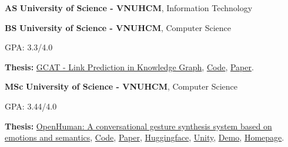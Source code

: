 

\begin{threecolentry}{\textbf{AS}}{
	}
	\textbf{University of Science - VNUHCM}, Information Technology
\end{threecolentry}

\begin{threecolentry}{\textbf{BS}}{
	}
	\textbf{University of Science - VNUHCM}, Computer Science
	\begin{highlights}
		\item GPA: 3.3/4.0
		\item \textbf{Thesis:} \href{https://hmthanh.github.io/file/GCAT_ReportEN.pdf}{GCAT - Link Prediction in Knowledge Graph}, \href{https://github.com/hmthanh/GCAT}{Code},  \href{https://hmthanh.github.io/file/GCAT_Paper.pdf}{Paper}.
		
	\end{highlights}
\end{threecolentry}

\begin{threecolentry}{\textbf{MSc}}{
	}
	\textbf{University of Science - VNUHCM}, Computer Science
	\begin{highlights}
		\item GPA: 3.44/4.0
		\item \textbf{Thesis:} \href{https://hmthanh.github.io/file/DeepGesture_ReportEN.pdf}{OpenHuman: A conversational gesture synthesis system based on emotions and semantics},
		\href{https://github.com/hmthanh/OHGesture}{Code},
		\href{https://hmthanh.github.io/file/DeepGesture_Paper.pdf}{\textnormal{Paper}},
		 \href{https://huggingface.co/openhuman/openhuman}{Huggingface}, \href{https://github.com/DeepGesture/deepgesture-unity}{Unity}, \href{https://youtu.be/yLwXdm7UgPE}{Demo}, \href{https://deepgesture.github.io}{Homepage}.
	\end{highlights}
\end{threecolentry}